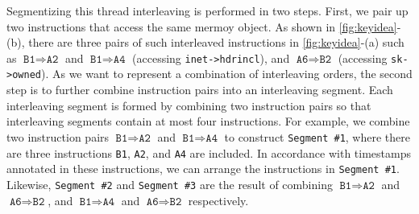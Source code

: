 Segmentizing this thread interleaving is performed in two steps.
%
First, we pair up two instructions that access the same mermoy object.
%
As shown in \autoref{fig:keyidea}-(b), there are three pairs of such
interleaved instructions in \autoref{fig:keyidea}-(a) such as
$\texttt{B1} \Rightarrow \texttt{A2}$ and
$\texttt{B1} \Rightarrow \texttt{A4}$ (accessing
\texttt{inet->hdrincl}), and $\texttt{A6} \Rightarrow \texttt{B2}$
(accessing \texttt{sk->owned}).
%
As we want to represent a combination of interleaving orders, the
second step is to further combine instruction pairs into an
interleaving segment.
%
Each interleaving segment is formed by combining two instruction pairs
so that interleaving segments contain at most four instructions.
%
For example, we combine two instruction pairs
$\texttt{B1} \Rightarrow \texttt{A2}$ and
$\texttt{B1} \Rightarrow \texttt{A4}$ to construct \texttt{Segment
  \#1}, where there are three instructions \texttt{B1}, \texttt{A2},
and \texttt{A4} are included.
%
In accordance with timestamps annotated in these instructions, we can
arrange the instructions in \texttt{Segment \#1}.
%
Likewise, \texttt{Segment \#2} and \texttt{Segment \#3} are the result
of combining $\texttt{B1} \Rightarrow \texttt{A2}$ and
$\texttt{A6} \Rightarrow \texttt{B2}$, and
$\texttt{B1} \Rightarrow \texttt{A4}$ and
$\texttt{A6} \Rightarrow \texttt{B2}$ respectively.

%
%



